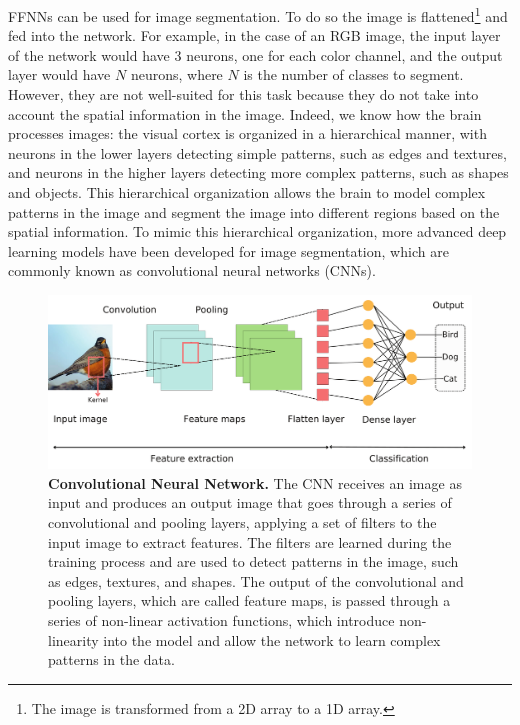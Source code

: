 FFNNs can be used for image segmentation. To do so the image is
flattened\footnote{The image is transformed from a 2D array to a 1D array.}
and fed into the network. For example, in the case of an RGB image, the input
layer of the network would have 3 neurons, one for each color channel, and the
output layer would have $N$ neurons, where $N$ is the number of classes to
segment. However, they are not well-suited for this task because they do not
take into account the spatial information in the image. Indeed, we know how the
brain processes images: the visual cortex is organized in a hierarchical
manner, with neurons in the lower layers detecting simple patterns, such as
edges and textures, and neurons in the higher layers detecting more complex
patterns, such as shapes and objects. This hierarchical organization allows the
brain to model complex patterns in the image and segment the image into
different regions based on the spatial information. To mimic this hierarchical
organization, more advanced deep learning models have been developed for image
segmentation, which are commonly known as convolutional neural networks (CNNs).

\begin{figure}[H]
  \centering
  \includegraphics[width=1\textwidth]{Figures/CNN.pdf}
  \caption[Convolutional Neural Network]{
    \textbf{Convolutional Neural Network.} The CNN receives an image as input
    and produces an output image that goes through a series of convolutional
    and pooling layers, applying a set of filters to the input image to
    extract features. The filters are learned during the training process and
    are used to detect patterns in the image, such as edges, textures, and
    shapes. The output of the convolutional and pooling layers, which are
    called feature maps, is passed through a series of non-linear activation
    functions, which introduce non-linearity into the model and allow the
    network to learn complex patterns in the data.}
  \label{fig:CNN_scheme}
\end{figure}

